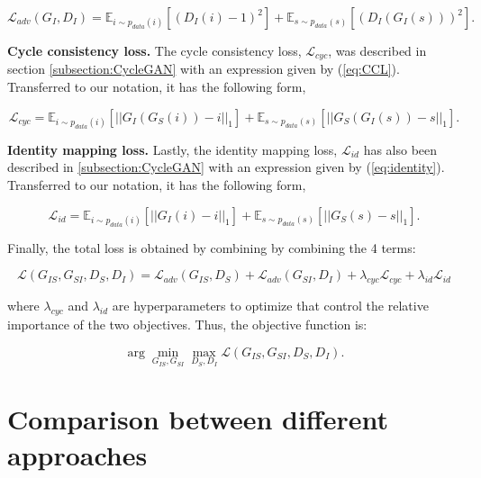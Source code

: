 \begin{equation}
    \mathcal{L}_{adv}(G_{I},D_I) = \mathbb{E}_{i \sim p_{data}(i)} [(D_I(i)-1)^2] + \mathbb{E}_{s \sim p_{data}(s)} [(D_I(G_{I}(s)))^2].
\end{equation}

\textbf{Cycle consistency loss.} The cycle consistency loss, $\mathcal{L}_{cyc}$, was described in section \ref{subsection:CycleGAN} with an expression given by (\ref{eq:CCL}). Transferred to our notation, it has the following form,

\begin{equation} 
\mathcal{L}_{cyc} = \mathbb{E}_{i \sim p_{data}(i)} [||G_{I}(G_{S}(i))-i||_1] + \mathbb{E}_{s \sim p_{data}(s)} [||G_{S}(G_{I}(s))-s||_1].
\label{eq:cly_2}
\end{equation}

\textbf{Identity mapping loss.} Lastly, the identity mapping loss, $\mathcal{L}_{id}$ has also been described in \ref{subsection:CycleGAN} with an expression given by (\ref{eq:identity}). Transferred to our notation, it has the following form,

\begin{equation}
    \mathcal{L}_{id} = \mathbb{E}_{i \sim p_{data}(i)} [||G_{I}(i)-i||_1] +  \mathbb{E}_{s \sim p_{data}(s)} [||G_{S}(s)-s||_1].
\end{equation}

Finally, the total loss is obtained by combining by combining the 4 terms:

\begin{equation}
\label{eq:total-cyclegan-loss}
    \mathcal{L}(G_{IS},G_{SI},D_S,D_I) = \mathcal{L}_{adv}(G_{IS},D_S) + \mathcal{L}_{adv}(G_{SI},D_I) + \lambda_{cyc} \mathcal{L}_{cyc} + \lambda_{id} \mathcal{L}_{id}
\end{equation}

\noindent where $\lambda_{cyc}$ and $\lambda_{id}$ are hyperparameters to optimize that control the relative importance of the two objectives. Thus, the objective function is:

\begin{equation}
    \arg \min_{G_{IS},G_{SI}}\max_{D_S,D_I} \mathcal{L}(G_{IS},G_{SI},D_S,D_I).
\end{equation}

\section{Comparison between different approaches}
\label{section:comparison}

